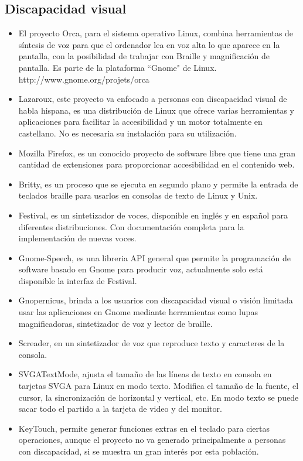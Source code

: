 \begin{multicols}{2}
\subsection*{Discapacidad visual}
\begin{itemize}
\item El proyecto Orca, para el sistema operativo Linux, combina herramientas de síntesis de voz para que el ordenador lea en voz alta lo que aparece en la pantalla, con la posibilidad de trabajar con Braille y magnificación de pantalla. Es parte de la plataforma “Gnome" de Linux. 
http://www.gnome.org/projets/orca
\item Lazaroux, este proyecto va enfocado a personas con discapacidad visual de habla hispana, es una distribución de Linux que ofrece varias herramientas y aplicaciones para facilitar la accesibilidad y un motor totalmente en castellano. No es necesaria su instalación para su utilización.
\item Mozilla Firefox, es un conocido proyecto de software libre que tiene una gran cantidad de extensiones para proporcionar accesibilidad en el contenido web.
\item Britty, es un proceso que se ejecuta en segundo plano y permite la entrada de teclados braille para usarlos en consolas de texto de Linux y Unix.
\item Festival, es un sintetizador de voces, disponible en inglés y en español para diferentes distribuciones. Con documentación completa para la implementación de nuevas voces.
\item Gnome-Speech, es una libreria API general que permite la programación de software basado en Gnome para producir voz, actualmente solo está disponible la interfaz de Festival.
\item Gnopernicus, brinda a los usuarios con discapacidad visual o visión limitada usar las aplicaciones en Gnome mediante herramientas como lupas magnificadoras, sintetizador de voz y lector de braille.
\item Screader, en un sintetizador de voz que reproduce texto y caracteres de la consola.
\item SVGATextMode, ajusta el tamaño de las líneas de texto en consola en tarjetas SVGA para Linux en modo texto. Modifica el tamaño de la fuente, el cursor, la sincronización de horizontal y vertical, etc. En modo texto se puede sacar todo el partido a la tarjeta de video y del monitor. 
\item KeyTouch, permite generar funciones extras en el teclado para ciertas operaciones, aunque el proyecto no va generado principalmente a personas con discapacidad, si se muestra un gran interés por esta población.
\end{itemize}


\end{multicols}
